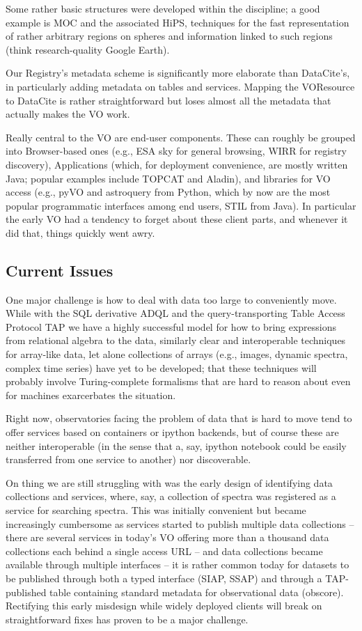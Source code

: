 Some rather basic structures were developed within the discipline; a
good example is MOC and the associated HiPS, techniques for the fast
representation of rather arbitrary regions on spheres and information
linked to such regions (think research-quality Google Earth).

Our Registry's metadata scheme is significantly more elaborate than
DataCite's, in particularly adding metadata on tables and services.
Mapping the VOResource to DataCite is rather straightforward but loses
almost all the metadata that actually makes the VO work.

Really central to the VO are end-user components.  These can roughly be
grouped into Browser-based ones (e.g., ESA sky for general browsing,
WIRR for registry discovery), Applications (which, for deployment
convenience, are mostly written Java; popular examples include TOPCAT
and Aladin), and libraries for VO access (e.g., pyVO and astroquery from
Python, which by now are the most popular programmatic interfaces among
end users, STIL from Java).  In particular the early VO had a tendency
to forget about these client parts, and whenever it did that, things
quickly went awry.


\subsection{Current Issues}

One major challenge is how to deal with data too large to conveniently
move.  While with the SQL derivative ADQL and the query-transporting
Table Access Protocol TAP we have a highly successful model for how to
bring expressions from relational algebra to the data, similarly clear and
interoperable techniques for array-like data, let alone collections of
arrays (e.g., images, dynamic spectra, complex time series) have yet to
be developed; that these techniques will probably involve
Turing-complete formalisms that are hard to reason about even for
machines exarcerbates the situation.  

Right now, observatories facing the problem of data that is hard to move
tend to offer services based on containers or ipython backends, but of
course these are neither interoperable (in the sense that a, say,
ipython notebook could be easily transferred from one service to
another) nor discoverable.

On thing we are still struggling with was the early design of
identifying data collections and services, where, say, a collection of
spectra was registered as a service for searching spectra.  This was
initially convenient but became increasingly cumbersome as services
started to publish multiple data collections -- there are several
services in today's VO offering more than a thousand data collections
each behind a single access URL -- and data collections became available
through multiple interfaces -- it is rather common today for datasets
to be published through both a typed interface (SIAP, SSAP) and through
a TAP-published table containing standard metadata for observational data
(obscore).  Rectifying this early misdesign while widely deployed
clients will break on straightforward fixes has proven to be a major
challenge.

